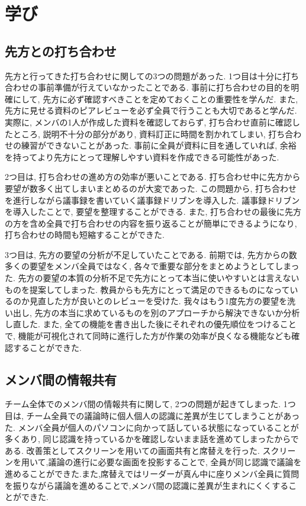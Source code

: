 \chapter{学び}
\section{先方との打ち合わせ}
先方と行ってきた打ち合わせに関しての3つの問題があった.
1つ目は十分に打ち合わせの事前準備が行えていなかったことである. 事前に打ち合わせの目的を明確にして, 先方に必ず確認すべきことを定めておくことの重要性を学んだ.
また, 先方に見せる資料のピアレビューを必ず全員で行うことも大切であると学んだ. 実際に, メンバの1人が作成した資料を確認しておらず, 打ち合わせ直前に確認したところ, 説明不十分の部分があり,
資料訂正に時間を割かれてしまい, 打ち合わせの練習ができないことがあった. 事前に全員が資料に目を通していれば, 余裕を持ってより先方にとって理解しやすい資料を作成できる可能性があった.

2つ目は, 打ち合わせの進め方の効率が悪いことである. 打ち合わせ中に先方から要望が数多く出てしまいまとめるのが大変であった. この問題から, 打ち合わせを進行しながら議事録を書いていく議事録ドリブンを導入した.
議事録ドリブンを導入したことで, 要望を整理することができる. また, 打ち合わせの最後に先方の方を含め全員で打ち合わせの内容を振り返ることが簡単にできるようになり, 打ち合わせの時間も短縮することができた.

3つ目は, 先方の要望の分析が不足していたことである.
前期では, 先方からの数多くの要望をメンバ全員ではなく, 各々で重要な部分をまとめようとしてしまった. 先方の要望の本質の分析不足で先方にとって本当に使いやすいとは言えないものを提案してしまった.
教員からも先方にとって満足のできるものになっているのか見直した方が良いとのレビューを受けた. 我々はもう1度先方の要望を洗い出し, 先方の本当に求めているものを別のアプローチから解決できないか分析し直した.
また, 全ての機能を書き出した後にそれぞれの優先順位をつけることで, 機能が可視化されて同時に進行した方が作業の効率が良くなる機能なども確認することができた.
\section{メンバ間の情報共有}
チーム全体でのメンバ間の情報共有に関して, 2つの問題が起きてしまった.
1つ目は, チーム全員での議論時に個人個人の認識に差異が生じてしまうことがあった. メンバ全員が個人のパソコンに向かって話している状態になっていることが多くあり,
同じ認識を持っているかを確認しないまま話を進めてしまったからである. 改善策としてスクリーンを用いての画面共有と席替えを行った. スクリーンを用いて,議論の進行に必要な画面を投影することで,
全員が同じ認識で議論を進めることができた.また,席替えではリーダーが真ん中に座りメンバ全員に質問を振りながら議論を進めることで,メンバ間の認識に差異が生まれにくくすることができた.

